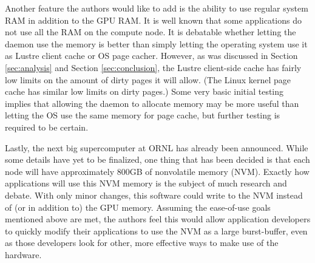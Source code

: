 Another feature the authors would like to add is the ability to use regular system RAM in addition to the GPU RAM.  It is well known that some applications do not use all the RAM on the compute node.  It is debatable whether letting the daemon use the memory is better than simply letting the operating system use it as  Lustre client cache or OS page cacher.  However, as was discussed in Section \ref{sec:analysis} and Section \ref{sec:conclusion}, the Lustre client-side cache has fairly low limits on the amount of dirty pages it will allow.  (The Linux kernel page cache has similar low limits on dirty pages.)  Some very basic initial testing implies that allowing the daemon to allocate memory may be more useful than letting the OS use the same memory for page cache, but further testing is required to be certain.

Lastly, the next big supercomputer at ORNL has already been announced.  While some details have yet to be finalized, one thing that has been decided is that each node will have approximately 800GB of nonvolatile memory (NVM).\cite{summit_page}  
Exactly how applications will use this NVM memory is the subject of much research and debate. With only minor changes, this software could write to the NVM instead of (or in addition to) the GPU memory.  Assuming the ease-of-use goals mentioned above are met, the authors feel this would allow application developers to quickly modify their applications to use the NVM as a large burst-buffer, even as those developers look for other, more effective ways to make use of the hardware.

